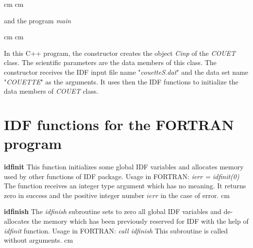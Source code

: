  cm 
{
\footnotesize
{}
\leftline{\{}
\leftline{\}}
\leftline{\{}
\leftline{\{}
\leftline{\}}
}
 cm

and the program {\it main}

 cm 
{
\footnotesize
{}
\leftline{\{}
\leftline{int ier;}
\leftline{ier = Cinp.COUETerr();}
\leftline{return ier;}
\leftline{\}}
}
 cm 

In this C++ program, the constructor creates the object {\it Cinp}
of the {\it COUET} class. The scientific parameters are the data members
of this class. The constructor receives the IDF input file name
"{\it couetteS.dat}"
and the data set name
"{\it COUETTE}"
as the arguments. It uses then the IDF
functions to initialize the data members of {\it COUET} class.

\section{IDF functions for the FORTRAN program}

{
{\bf idfinit}\hfil\break
This function initializes some global IDF variables
and allocates memory used by other functions of IDF package.
Usage in FORTRAN:\hfil\break
{\it ierr = idfinit(0)}\hfil\break
The function receives an integer type argument which has no meaning. 
It returns zero in success
and the positive integer number $ierr$ in the case of error.
}
 cm

{
{\bf idfinish}\hfil\break
The {\it idfinish} subroutine sets to zero all global IDF variables and
de-allocates the memory which has been previously reserved for IDF
with the help of {\it idfinit} function.
Usage in FORTRAN:\hfil\break
{\it call idfinish}\hfil\break
This subroutine is called without arguments. 
}
 cm

